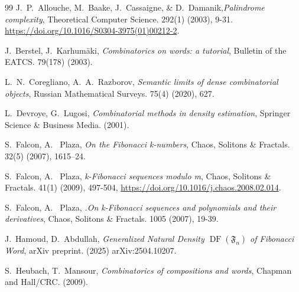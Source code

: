 \documentclass[11pt, a4paper]{article}
\newcommand{\DF}{\operatorname{DF}}
\theoremstyle{definition}
\begin{document}
\begin{thebibliography}{99}
 J.~P.~Allouche, M.~Baake,  J.~Cassaigne, \& D.~Damanik,\emph{Palindrome complexity},  Theoretical Computer Science. 292(1) (2003), 9-31.  \url{https://doi.org/10.1016/S0304-3975(01)00212-2}.


 J.~Berstel, J.~Karhumäki,  \emph{Combinatorics on words: a tutorial}, Bulletin of the EATCS. 79(178) (2003). 


 L.~N.~Coregliano, A.~A.~Razborov,  \emph{Semantic limits of dense combinatorial objects}, Russian Mathematical Surveys. 75(4) (2020), 627.

 L.~Devroye, G.~Lugosi,  \emph{Combinatorial methods in density estimation}, Springer Science \& Business Media. (2001).


 S.~Falcon, A.~ Plaza, \emph{On the Fibonacci k-numbers}, Chaos, Solitons \& Fractals. 32(5) (2007), 1615–24.

 S.~Falcon, A.~ Plaza, \emph{k-Fibonacci sequences modulo m}, Chaos, Solitons \& Fractals. 41(1) (2009), 497-504, \url{https://doi.org/10.1016/j.chaos.2008.02.014}. 

 S.~Falcon, A.~ Plaza, \emph{.On k-Fibonacci sequences and polynomials and their derivatives}, Chaos, Solitons \& Fractals. 1005 (2007), 19-39.

 J.~Hamoud, D.~Abdullah,  \emph{Generalized Natural Density $\DF (\mathfrak {F} _n)$ of Fibonacci Word}, arXiv preprint. (2025) arXiv:2504.10207.

 S.~Heubach,  T.~Mansour,  \emph{Combinatorics of compositions and words}, Chapman and Hall/CRC. (2009).


\end{thebibliography}
\end{document}
